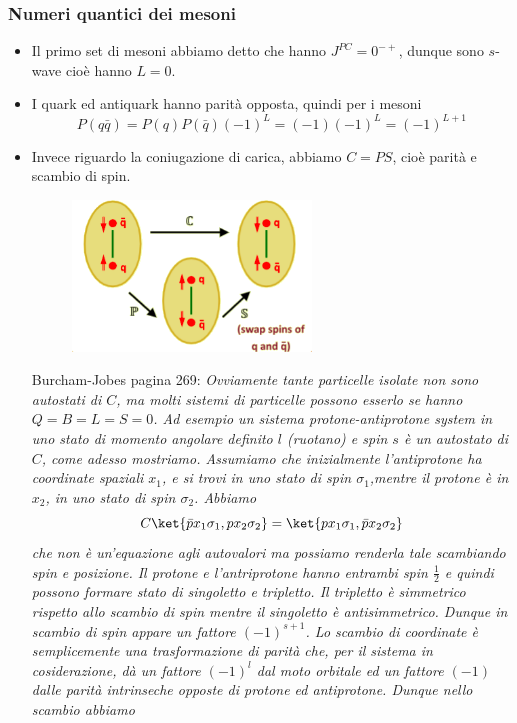 \subsubsection{Numeri quantici dei mesoni}
\begin{itemize}
    \item Il primo set di mesoni abbiamo detto che hanno $J^{PC}=0^{-+}$, dunque sono $s$-wave cioè hanno $L=0$. 
    \item I quark ed antiquark hanno parità opposta, quindi per i mesoni
    \begin{equation*}
    P(q\bar q)=P(q)P({\bar q})(-1)^L=(-1)(-1)^L=(-1)^{L+1}
    \end{equation*}
    \item Invece riguardo la coniugazione di carica, abbiamo $C=PS$, cioè parità e scambio di spin.
    \begin{figure}[H]
        \centering
        \includegraphics[width=0.6\textwidth]{immagini/fig_charge_conj_mesons.png}
    \end{figure}
    Burcham-Jobes pagina 269: \textit{Ovviamente tante particelle isolate non sono autostati di $C$, ma molti sistemi di particelle possono esserlo se hanno $Q=B=L= S = 0$. Ad esempio un sistema protone-antiprotone system in uno stato di momento angolare definito $l$ (ruotano) e spin $s$ è un autostato di $C$, come adesso mostriamo. Assumiamo che inizialmente l'antiprotone ha coordinate spaziali $x_1$, e si trovi in uno stato di spin $\sigma_1$,mentre il protone è in $x_2$, in uno stato di spin $\sigma_2$. Abbiamo}
    \begin{equation*}
    C\ket{\bar px_1\sigma_1,px_2\sigma_2}=\ket{px_1\sigma_1,\bar px_2\sigma_2}
    \end{equation*}
    \textit{che non è un'equazione agli autovalori ma possiamo renderla tale scambiando spin e posizione. Il protone e l'antriprotone hanno entrambi spin $\frac12$ e quindi possono formare stato di singoletto e tripletto. Il tripletto è simmetrico rispetto allo scambio di spin mentre il singoletto è antisimmetrico. Dunque in scambio di spin appare un fattore $(-1)^{s+1}$. Lo scambio di coordinate è semplicemente una trasformazione di parità che, per il sistema in cosiderazione, dà un fattore $(-1)^l$ dal moto orbitale ed un fattore $(-1)$ dalle parità intrinseche opposte di protone ed antiprotone. Dunque nello scambio abbiamo }

\end{itemize}
